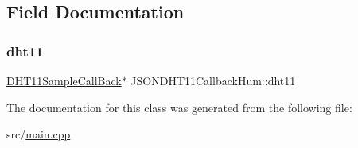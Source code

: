 \subsection{Field Documentation}
\mbox{\label{classJSONDHT11CallbackHum_a6f4b2f8203acb357b5f01163f5cb76d8}} 
\subsubsection{\texorpdfstring{dht11}{dht11}}
{\footnotesize\ttfamily \hyperlink{classDHT11SampleCallBack}{D\+H\+T11\+Sample\+Call\+Back}$\ast$ J\+S\+O\+N\+D\+H\+T11\+Callback\+Hum\+::dht11\hspace{0.3cm}{\ttfamily [private]}}



The documentation for this class was generated from the following file\+:\begin{DoxyCompactItemize}
\item 
src/\hyperlink{main_8cpp}{main.\+cpp}\end{DoxyCompactItemize}
